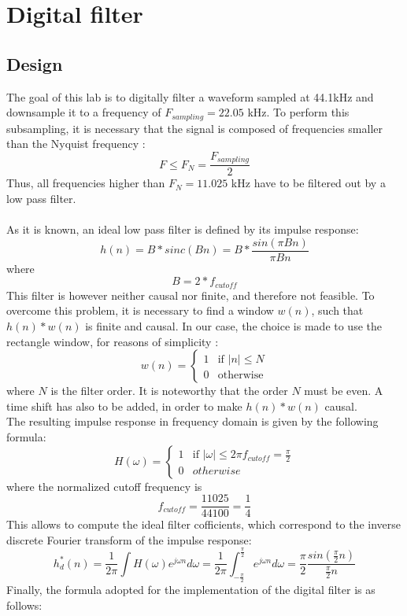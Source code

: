 \chapter{Digital filter}

\section{Design}

The goal of this lab is to digitally filter a waveform sampled at 44.1kHz and downsample it to a frequency of $F_{sampling}=22.05$ kHz. To perform this subsampling, it is necessary that the signal is composed of frequencies smaller than the Nyquist frequency : 
\[ F \le F_N = \frac{F_{sampling}}{2} \] 
Thus, all frequencies higher than $ F_N = 11.025$ kHz have to be filtered out by a low pass filter.\\
\\
As it is known, an ideal low pass filter is defined by its impulse response: 
\[ h(n) = B*sinc(Bn) = B * \frac{sin(\pi Bn)}{\pi Bn} \] where \[B = 2*f_{cutoff}\]
This filter is however neither causal nor finite, and therefore not feasible. To overcome this problem, it is necessary to find a window $w(n)$, such that $h(n)*w(n)$ is finite and causal. In our case, the choice is made to use the rectangle window, for reasons of simplicity : \[ w(n) = \left\{
\begin{array}{ll}
1 & \mbox{if } \vert n \vert  \le N\\
0 & \mbox{otherwise}
\end{array}
\right. \]
where $N$ is the filter order. It is noteworthy that the order $N$ must be even. A time shift has also to be added, in order to make $h(n)*w(n)$ causal. \\
The resulting impulse response in frequency domain is given by the following formula:
\[
H(\omega) = \left\{ 
	\begin{array}{ll}
	1 & \mbox{if } \vert \omega \vert \le 2 \pi f_{cutoff} = \frac{\pi}{2}\\
	0 & otherwise
	\end{array}
	\right.
\]
where the normalized cutoff frequency is \[f_{cutoff} = \frac{11025}{44100} = \frac{1}{4}\]
This allows to compute the ideal filter cofficients, which correspond to the inverse discrete Fourier transform of the impulse response:
\[
h_d^*(n) = \frac{1}{2\pi} \int H(\omega) e^{j\omega n} d\omega = \frac{1}{2\pi} \int_{-\frac{\pi}{2}}^{\frac{\pi}{2}} e^{j \omega n} d\omega = \frac{\pi}{2}  \frac{sin(\frac{\pi}{2} n)}{\frac{\pi}{2} n}
\]
Finally, the formula adopted for the implementation of the digital filter is as follows:

